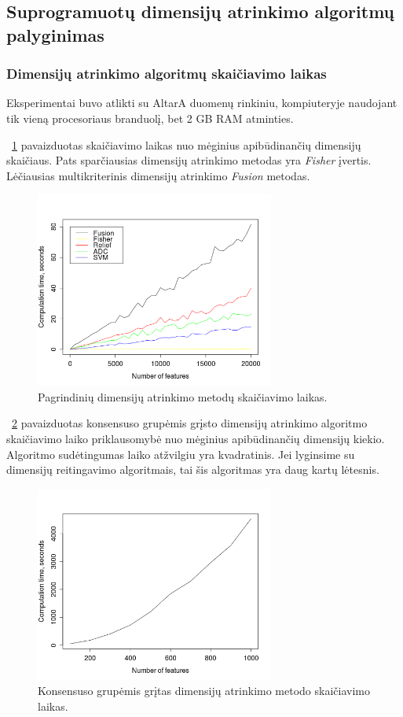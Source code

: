 \subsection{Suprogramuotų dimensijų atrinkimo algoritmų palyginimas}

\subsubsection{Dimensijų atrinkimo algoritmų skaičiavimo laikas}

Eksperimentai buvo atlikti su AltarA duomenų rinkiniu, kompiuteryje naudojant tik vieną procesoriaus branduolį, bet 2 GB RAM atminties. 

~\ref{fig:visu_laikas} pavaizduotas skaičiavimo laikas nuo mėginius apibūdinančių dimensijų skaičiaus. Pats sparčiausias dimensijų atrinkimo metodas yra \textit{Fisher} įvertis. Lėčiausias multikriterinis dimensijų atrinkimo \textit{Fusion} metodas.
\begin{figure}
 \centering
 \includegraphics[width=0.7\textwidth]{images/all_performance.png}
 \caption{Pagrindinių dimensijų atrinkimo metodų skaičiavimo laikas.}
 \label{fig:visu_laikas}
\end{figure}
~\ref{fig:cgs_laikas} pavaizduotas konsensuso grupėmis grįsto dimensijų atrinkimo algoritmo skaičiavimo laiko priklausomybė nuo mėginius apibūdinančių dimensijų kiekio. Algoritmo sudėtingumas laiko atžvilgiu yra kvadratinis. Jei lyginsime su dimensijų reitingavimo algoritmais, tai šis algoritmas yra daug kartų lėtesnis.
\begin{figure}
 \centering
 \includegraphics[width=0.7\textwidth]{images/cgs_performance.png}
 \caption{Konsensuso grupėmis grįtas dimensijų atrinkimo metodo skaičiavimo laikas.}
 \label{fig:cgs_laikas}
\end{figure}

